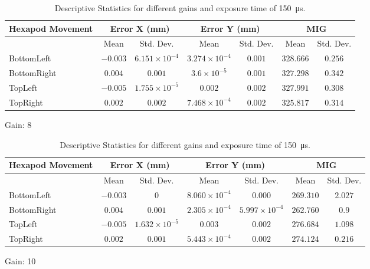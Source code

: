 \begin{table}[h]
    \vspace{10pt}

    \begin{subtable}{\textwidth}
        \centering
        \footnotesize
        \begin{tabular}{lcccccc}
            \toprule
            Hexapod Movement & \multicolumn{2}{c}{Error X (mm)} & \multicolumn{2}{c}{Error Y (mm)} & \multicolumn{2}{c}{MIG}  \\
            \midrule
            & \multicolumn{1}{c}{Mean} & \multicolumn{1}{c}{Std. Dev.} & \multicolumn{1}{c}{Mean} & \multicolumn{1}{c}{Std. Dev.} & \multicolumn{1}{c}{Mean} & \multicolumn{1}{c}{Std. Dev.} \\
            \midrule
            \textsf{BottomLeft} & $-0.003$ & $6.151\times10^{-4}$ & $3.274\times10^{-4}$ & $0.001$ & $328.666$ & $0.256$ \\
            \textsf{BottomRight} & $0.004$ & $0.001$ & $3.6\times10^{-5}$ & $0.001$ & $327.298$ & $0.342$ \\
            \textsf{TopLeft} & $-0.005$ & $1.755\times10^{-5}$ & $0.002$ & $0.002$ & $327.991$ & $0.308$ \\
            \textsf{TopRight} & $0.002$ & $0.002$ & $7.468\times10^{-4}$ & $0.002$ & $325.817$ & $0.314$ \\
            \bottomrule
        \end{tabular}
        \caption{Gain: 8}
    \end{subtable}

    \vspace{10pt}

    \begin{subtable}{\textwidth}
        \centering
        \footnotesize
        \begin{tabular}{lcccccc}
            \toprule
            Hexapod Movement & \multicolumn{2}{c}{Error X (mm)} & \multicolumn{2}{c}{Error Y (mm)} & \multicolumn{2}{c}{MIG}  \\
            \midrule
            & \multicolumn{1}{c}{Mean} & \multicolumn{1}{c}{Std. Dev.} & \multicolumn{1}{c}{Mean} & \multicolumn{1}{c}{Std. Dev.} & \multicolumn{1}{c}{Mean} & \multicolumn{1}{c}{Std. Dev.} \\
            \midrule
            \textsf{BottomLeft} & $-0.003$ & $0$ & $8.060\times10^{-4}$ & $0.000$ & $269.310$ & $2.027$ \\
            \textsf{BottomRight} & $0.004$ & $0.001$ & $2.305\times10^{-4}$ & $5.997\times10^{-4}$ & $262.760$ & $0.9$ \\
            \textsf{TopLeft} & $-0.005$ & $1.632\times10^{-5}$ & $0.003$ & $0.002$ & $276.684$ & $1.098$ \\
            \textsf{TopRight} & $0.002$ & $0.001$ & $5.443\times10^{-4}$ & $0.002$ & $274.124$ & $0.216$ \\
            \bottomrule
        \end{tabular}
        \caption{Gain: 10}
    \end{subtable}

    \caption{Descriptive Statistics for different gains and exposure time of \SI{150}{\micro\second}.}
    \label{table:stats_matrix_gain}
\end{table}

